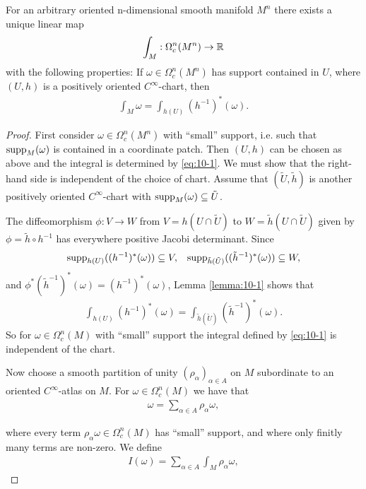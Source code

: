 \begin{proposition}\label{prop:10-2}
  For an arbitrary oriented n-dimensional smooth manifold $M^n$ there exists a unique linear map
  \begin{align*}
    \int_M: \Omega^n_c(M^n)\to {\ensuremath{\mathbb{R}}}
  \end{align*}
  with the following properties: If $\omega\in\Omega_c^n(M^n)$ has support contained in $U$, 
  where $(U, h)$ is a positively oriented $C^\infty$-chart, then 
  \begin{align}\label{eq:10-1}
    \int_M \omega = \int_{h(U)} (h^{-1})^*(\omega).
  \end{align}
\end{proposition}

\begin{proof}
  First consider $\omega\in \Omega^n_c(M^n)$ with ``small'' support, i.e. such that $\operatorname{supp}_M(\omega)$
is contained in a coordinate patch. Then $(U, h)$ can be chosen as above and
the integral is determined by \eqref{eq:10-1}. We must show that the right-hand side is
independent of the choice of chart. Assume that $(\tilde{U}, \tilde h)$ is another positively
oriented $C^\infty$-chart with $\operatorname{supp}_M(\omega)\subseteq \tilde{U}$.

The diffeomorphism $\phi:V\to W$ from $V=h(U\cap \tilde{U})$ to $W=\tilde{h}(U\cap \tilde{U})$ given 
by $\phi=\tilde{h}\circ h^{-1}$ has everywhere positive Jacobi determinant. Since 
\begin{align*}
  \operatorname{supp}_{h(U)}((h^{-1})^*(\omega))\subseteq V, && 
  \operatorname{supp}_{\tilde{h}(\tilde{U})}((\tilde{h}^{-1})^*(\omega))\subseteq W,
\end{align*}
and $\phi^*(\tilde{h}^{-1})^*(\omega) = (h^{-1})^*(\omega)$, Lemma \ref{lemma:10-1} shows that 
\begin{align*}
  \int_{h(U)} (h^{-1})^*(\omega) = \int_{\tilde{h}(\tilde{U})} (\tilde{h}^{-1})^*(\omega).
\end{align*}
So for $\omega\in\Omega_c^n(M)$ with ``small'' support the integral defined by \eqref{eq:10-1} is independent
of the chart.

Now choose a smooth partition of unity $(\rho_\alpha)_{\alpha\in A}$ on $M$ subordinate to an 
oriented $C^\infty$-atlas on $M$. For $\omega\in\Omega_c^n(M)$ we have that 
\begin{align*}
  \omega = \sum_{\alpha\in A} \rho_\alpha\omega,
\end{align*}

where every term $\rho_\alpha\omega\in\Omega^n_c(M)$ has ``small'' support, and where only 
finitly many terms are non-zero. We define 
\begin{align*}
  I(\omega) = \sum_{\alpha\in A} \int_M \rho_\alpha\omega,
\end{align*}


\end{proof}
